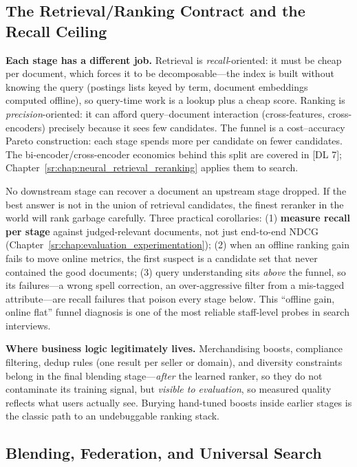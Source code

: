 \subsection{The Retrieval/Ranking Contract and the Recall Ceiling}

\textbf{Each stage has a different job.} Retrieval is \textit{recall}-oriented: it must be cheap per document, which forces it to be decomposable---the index is built without knowing the query (postings lists keyed by term, document embeddings computed offline), so query-time work is a lookup plus a cheap score. Ranking is \textit{precision}-oriented: it can afford query--document interaction (cross-features, cross-encoders) precisely because it sees few candidates. The funnel is a cost--accuracy Pareto construction: each stage spends more per candidate on fewer candidates. The bi-encoder/cross-encoder economics behind this split are covered in [DL 7]; Chapter~\ref{sr:chap:neural_retrieval_reranking} applies them to search.

\begin{keyinsight}
No downstream stage can recover a document an upstream stage dropped. If the best answer is not in the union of retrieval candidates, the finest reranker in the world will rank garbage carefully. Three practical corollaries: (1) \textbf{measure recall per stage} against judged-relevant documents, not just end-to-end NDCG (Chapter~\ref{sr:chap:evaluation_experimentation}); (2) when an offline ranking gain fails to move online metrics, the first suspect is a candidate set that never contained the good documents; (3) query understanding sits \textit{above} the funnel, so its failures---a wrong spell correction, an over-aggressive filter from a mis-tagged attribute---are recall failures that poison every stage below. This ``offline gain, online flat'' funnel diagnosis is one of the most reliable staff-level probes in search interviews.
\end{keyinsight}

\textbf{Where business logic legitimately lives.} Merchandising boosts, compliance filtering, dedup rules (one result per seller or domain), and diversity constraints belong in the final blending stage---\textit{after} the learned ranker, so they do not contaminate its training signal, but \textit{visible to evaluation}, so measured quality reflects what users actually see. Burying hand-tuned boosts inside earlier stages is the classic path to an undebuggable ranking stack.

\subsection{Blending, Federation, and Universal Search}
\label{sr:sec:federation_blending}

